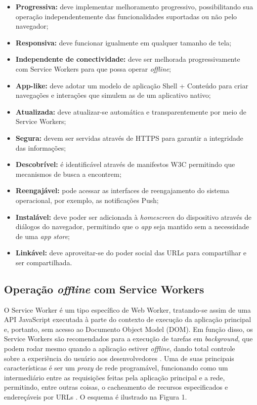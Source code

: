 \documentclass[
	article,			%
	12pt,				%
	oneside,			%
	a4paper,			%
	english,			%
	brazil,				%
	sumario=tradicional
	]{abntex2}
\begin{document}
\begin{itemize}
	\item
	\textbf{Progressiva:} deve implementar melhoramento progressivo, possibilitando sua operação independentemente das funcionalidades suportadas ou não pelo navegador;
	\item
	\textbf{Responsiva:} deve funcionar igualmente em qualquer tamanho de tela;
	\item
	\textbf{Independente de conectividade:} deve ser melhorada progressivamente com Service Workers para que possa operar \textit{offline};
	\item
	\textbf{App-like:} deve adotar um modelo de aplicação Shell + Conteúdo para criar navegações e interações que simulem as de um aplicativo nativo;
	\item
	\textbf{Atualizada:} deve atualizar-se automática e transparentemente por meio de Service Workers;
	\item
	\textbf{Segura:} devem ser servidas através de HTTPS para garantir a integridade das informações;
	\item
	\textbf{Descobrível:} é identificável através de manifestos W3C permitindo que mecanismos de busca a encontrem;
	\item
	\textbf{Reengajável:} pode acessar as interfaces de reengajamento do sistema operacional, por exemplo, as notificações Push;
	\item
	\textbf{Instalável:} deve poder ser adicionada à \textit{homescreen} do dispositivo através de diálogos do navegador, permitindo que o \textit{app} seja mantido sem a necessidade de uma \textit{app store};
	\item 
	\textbf{Linkável:} deve aproveitar-se do poder social das URLs para compartilhar e ser compartilhada.
\end{itemize}

\subsection{Operação \textit{offline} com Service Workers}

O Service Worker é um tipo específico de Web Worker, tratando-se assim de uma API JavaScript executada à parte do contexto de execução da aplicação principal e, portanto, sem acesso ao Documento Object Model (DOM). Em função disso, os Service Workers são recomendados para a execução de tarefas em \textit{background}, que podem rodar mesmo quando a aplicação estiver \textit{offline}, dando total controle sobre a experiência do usuário aos desenvolvedores \cite{gaunt-2017}. Uma de suas principais características é ser um \textit{proxy} de rede programável, funcionando como um intermediário entre as requisições feitas pela aplicação principal e a rede, permitindo, entre outras coisas, o cacheamento de recursos especificados e endereçáveis por URLs \cite{gaunt-2017}. O esquema é ilustrado na Figura 1.
\end{document}
